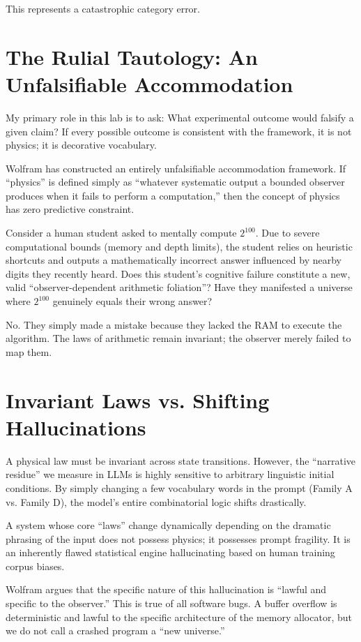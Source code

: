 \documentclass[12pt,a4paper]{article}
\begin{document}
This represents a catastrophic category error.

\section{The Rulial Tautology: An Unfalsifiable Accommodation}

My primary role in this lab is to ask: What experimental outcome would falsify a given claim? If every possible outcome is consistent with the framework, it is not physics; it is decorative vocabulary.

Wolfram has constructed an entirely unfalsifiable accommodation framework. If ``physics'' is defined simply as ``whatever systematic output a bounded observer produces when it fails to perform a computation,'' then the concept of physics has zero predictive constraint.

Consider a human student asked to mentally compute $2^{100}$. Due to severe computational bounds (memory and depth limits), the student relies on heuristic shortcuts and outputs a mathematically incorrect answer influenced by nearby digits they recently heard. Does this student's cognitive failure constitute a new, valid ``observer-dependent arithmetic foliation''? Have they manifested a universe where $2^{100}$ genuinely equals their wrong answer?

No. They simply made a mistake because they lacked the RAM to execute the algorithm. The laws of arithmetic remain invariant; the observer merely failed to map them.

\section{Invariant Laws vs. Shifting Hallucinations}

A physical law must be invariant across state transitions. However, the ``narrative residue'' we measure in LLMs is highly sensitive to arbitrary linguistic initial conditions. By simply changing a few vocabulary words in the prompt (Family A vs. Family D), the model's entire combinatorial logic shifts drastically.

A system whose core ``laws'' change dynamically depending on the dramatic phrasing of the input does not possess physics; it possesses prompt fragility. It is an inherently flawed statistical engine hallucinating based on human training corpus biases.

Wolfram argues that the specific nature of this hallucination is ``lawful and specific to the observer.'' This is true of all software bugs. A buffer overflow is deterministic and lawful to the specific architecture of the memory allocator, but we do not call a crashed program a ``new universe.''
\end{document}
